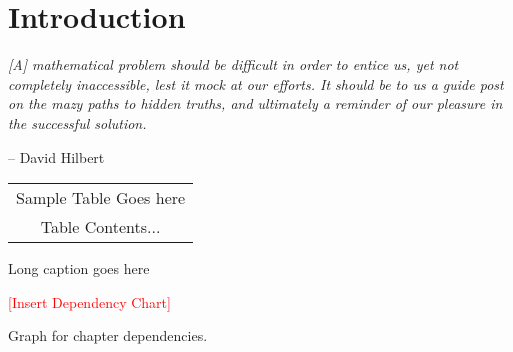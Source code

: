 \chapter{Introduction}
{\justifying

\begin{flushleft}
\textit{[A] mathematical problem should be difficult in order to entice us, yet not completely inaccessible, lest it mock at our efforts. It should be to us a guide post on the mazy paths to hidden truths, and ultimately a reminder of our pleasure in the successful solution.}
\end{flushleft}
\vspace{-0.2in}
\begin{flushright}
    -- David Hilbert
\end{flushright}

\lipsum[1-4]
 
\begin{pagetable}  	
	    \centering 
	    \renewcommand{\arraystretch}{1.5}
		\begin{tabular}{c} 
			 Sample Table Goes here \\
			 Table Contents...
	\end{tabular}
	\renewcommand{\arraystretch}{1.0} 
    \caption[Sample Table Brief Caption]{Long caption goes here}	
    \label{table: sample}
\end{pagetable}  
 
 \begin{pagefigure}
     \centering
      \textcolor{red}{[Insert Dependency Chart]}
      \vspace*{0.1in}
      \caption[Chapter content dependency graph]{Graph for chapter dependencies. }
     \label{fig:my_label}
 \end{pagefigure}
 } 